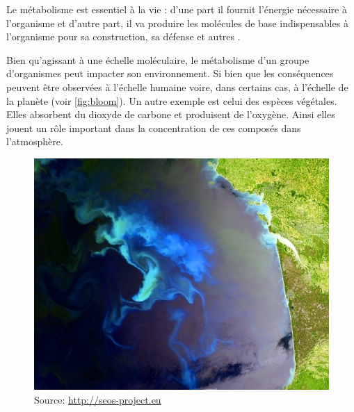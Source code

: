 \begin{refsegment}
    Le métabolisme est essentiel à la vie : d'une part il fournit l'énergie nécessaire à l'organisme et d'autre part, il va produire les molécules de base indispensables à l'organisme pour sa construction, sa défense et autres .
    
    Bien qu'agissant à une échelle moléculaire, le métabolisme d'un groupe d'organismes peut impacter son environnement. Si bien que les conséquences peuvent être observées à l'échelle humaine voire, dans certains cas, à l'échelle de la planète (voir \cref{fig:bloom}). Un autre exemple est celui des espèces végétales. Elles absorbent du dioxyde de carbone et produisent de l'oxygène. Ainsi elles jouent un rôle important dans la concentration de ces composés dans l'atmosphère.
    
    
    \begin{shadedfigure}[H]
        \begin{subfigure}[b]{.5\textwidth}
            \centering
            \includegraphics[width=\textwidth]{img/bloom_gascogne.jpg}
            \caption{{\tiny Source: \url{http://seos-project.eu}}}
            \label{fig:bloom_gascogne}
        \end{subfigure}
        \hfill
        \begin{subfigure}[b]{.5\textwidth}
            \centering

\end{subfigure}
\end{shadedfigure}
\end{refsegment}
